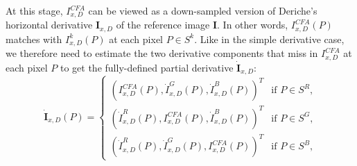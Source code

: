 \documentclass[twoside]{article}
\newcommand\Smo{\bar} %
\DeclareMathOperator{\e}{e}
\begin{document}
%
%
%	
%	
%	
%	
%	
%	
%	
%	
%	
%
%	
%	
%	
%	
%	
%	
%	
%	
%	


At this stage, $I_{x,D}^{CFA}$ can be viewed as a down-sampled version of Deriche's horizontal derivative $\mathbf{I}_{x,D}$ of the reference image $\mathbf{I}$. In other words, $I_{x,D}^{CFA}(P)$ matches with $I^k_{x,D}(P)$ at each pixel $P \in S^k$.
Like in the simple derivative case, we therefore need to estimate the two derivative components that miss in $I_{x,D}^{CFA}$ at each pixel $P$ to get the fully-defined partial derivative $\dot{\textbf{I}}_{x,D}$:
\begin{equation}
\dot{\textbf{I}}_{x,D}(P) = \left\lbrace
\begin{array}{cl}
\left( I_{x,D}^{CFA}(P), \dot{I}^G_{x,D}(P), \dot{I}^B_{x,D}(P) \right)^T & \text{if $P \in S^{R}$,}\\
\left( \dot{I}^R_{x,D}(P), I_{x,D}^{CFA}(P), \dot{I}^B_{x,D}(P) \right)^T & \text{if $P \in S^G$,}\\
\left( \dot{I}^R_{x,D}(P), \dot{I}^G_{x,D}(P), I_{x,D}^{CFA}(P) \right)^T & \text{if $P \in S^{B}$,}
\end{array}\right.
\label{eq:I^D_p_x}
\end{equation}
\end{document}
